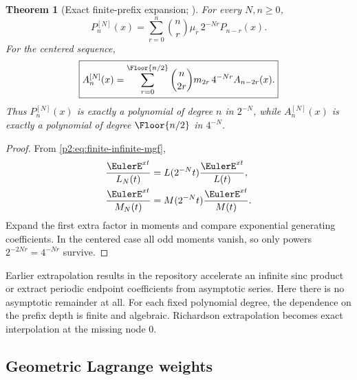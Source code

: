 \documentclass[11pt,oneside]{article}
\numberwithin{equation}{section}
\newtheorem{theorem}{Theorem}[section]
\theoremstyle{definition}
\theoremstyle{remark}
\begin{document}
\begin{theorem}[Exact finite-prefix expansion; \statusnew]
\label{p2:thm:finite-prefix-expansion}
For every $N,n\ge0$,
\begin{equation}
 \boxed{
 P_n^{[N]}(x)
 =\sum_{r=0}^{n}\binom nr\mu_r\,2^{-Nr}P_{n-r}(x).
 }
 \label{p2:eq:P-prefix-expansion}
\end{equation}
For the centered sequence,
\begin{equation}
 \boxed{
 A_n^{[N]}(x)
 =\sum_{r=0}^{\Floor{n/2}}
 \binom n{2r}m_{2r}\,4^{-Nr}A_{n-2r}(x).
 }
 \label{p2:eq:A-prefix-expansion}
\end{equation}
Thus $P_n^{[N]}(x)$ is exactly a polynomial of degree $n$ in $2^{-N}$, while
$A_n^{[N]}(x)$ is exactly a polynomial of degree $\Floor{n/2}$ in $4^{-N}$.
\end{theorem}

\begin{proof}
From \eqref{p2:eq:finite-infinite-mgf},
\begin{align*}
 \frac{\EulerE^{xt}}{L_N(t)}
 &=L(2^{-N}t)\frac{\EulerE^{xt}}{L(t)},\\
 \frac{\EulerE^{xt}}{M_N(t)}
 &=M(2^{-N}t)\frac{\EulerE^{xt}}{M(t)}.
\end{align*}
Expand the first extra factor in moments and compare exponential generating coefficients.  In the
centered case all odd moments vanish, so only powers $2^{-2Nr}=4^{-Nr}$ survive.
\end{proof}

\begin{remark}
Earlier extrapolation results in the repository accelerate an infinite sinc product or extract
periodic endpoint coefficients from asymptotic series.  Here there is no asymptotic remainder at
all.  For each fixed polynomial degree, the dependence on the prefix depth is finite and algebraic.
Richardson extrapolation becomes exact interpolation at the missing node $0$.
\end{remark}

\subsection{Geometric Lagrange weights}
\end{document}
